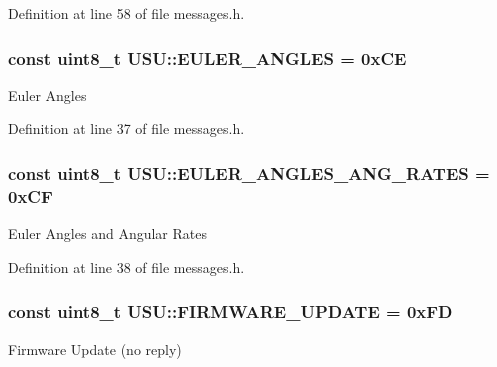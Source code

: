 \-Definition at line 58 of file messages.\-h.

\hypertarget{namespace_u_s_u_a6d35ce7963dec25cc43e551dccd71453}{
\subsubsection[{\-E\-U\-L\-E\-R\-\_\-\-A\-N\-G\-L\-E\-S}]{\setlength{\rightskip}{0pt plus 5cm}const uint8\-\_\-t {\bf \-U\-S\-U\-::\-E\-U\-L\-E\-R\-\_\-\-A\-N\-G\-L\-E\-S} = 0x\-C\-E}}\label{namespace_u_s_u_a6d35ce7963dec25cc43e551dccd71453}
\-Euler \-Angles 

\-Definition at line 37 of file messages.\-h.

\hypertarget{namespace_u_s_u_af604e3d925c2fe95f8a6b1af3f79d2d0}{
\subsubsection[{\-E\-U\-L\-E\-R\-\_\-\-A\-N\-G\-L\-E\-S\-\_\-\-A\-N\-G\-\_\-\-R\-A\-T\-E\-S}]{\setlength{\rightskip}{0pt plus 5cm}const uint8\-\_\-t {\bf \-U\-S\-U\-::\-E\-U\-L\-E\-R\-\_\-\-A\-N\-G\-L\-E\-S\-\_\-\-A\-N\-G\-\_\-\-R\-A\-T\-E\-S} = 0x\-C\-F}}\label{namespace_u_s_u_af604e3d925c2fe95f8a6b1af3f79d2d0}
\-Euler \-Angles and \-Angular \-Rates 

\-Definition at line 38 of file messages.\-h.

\hypertarget{namespace_u_s_u_a321d286cf60a5fd674ad8c0286db8748}{
\subsubsection[{\-F\-I\-R\-M\-W\-A\-R\-E\-\_\-\-U\-P\-D\-A\-T\-E}]{\setlength{\rightskip}{0pt plus 5cm}const uint8\-\_\-t {\bf \-U\-S\-U\-::\-F\-I\-R\-M\-W\-A\-R\-E\-\_\-\-U\-P\-D\-A\-T\-E} = 0x\-F\-D}}\label{namespace_u_s_u_a321d286cf60a5fd674ad8c0286db8748}
\-Firmware \-Update (no reply) 

